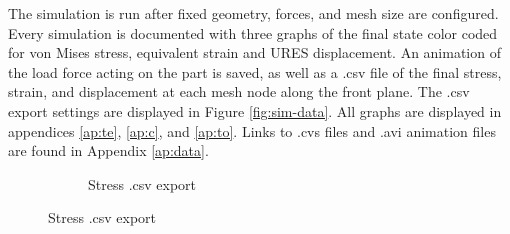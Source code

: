 \documentclass[12pt, letterpaper]{article}
\begin{document}
The simulation is run after fixed geometry, forces, and mesh size are configured. 
Every simulation is documented with three graphs of the final state color coded for von Mises stress, equivalent strain and URES displacement. An animation of the load force acting on the part is saved, as well as a .csv file of the final stress, strain, and displacement at each mesh node along the front plane. The .csv export settings are displayed in Figure \ref{fig:sim-data}. All graphs are displayed in appendices \ref{ap:te}, \ref{ap:c}, and \ref{ap:to}. Links to .cvs files and .avi animation files are found in Appendix \ref{ap:data}. 

\begin{figure}[H]
	\centering
	\caption{Data Export}
	\label{fig:sim-data}
	\begin{subfigure}[b]{.3\linewidth}
		\caption{Stress .csv export}

\end{subfigure}
\end{figure}
\end{document}
